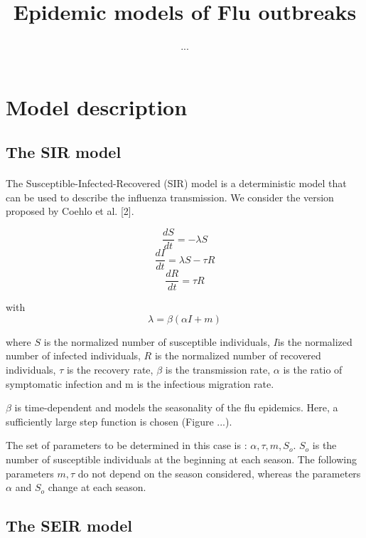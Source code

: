 \documentclass[11pt, a4paper]{article}
\author{...}
\title{Epidemic models of Flu outbreaks}
\begin{document}
\maketitle

\section{Model description}
\subsection{The SIR model}
\paragraph{}
The Susceptible-Infected-Recovered (SIR) model is a deterministic model that can be used to describe the influenza transmission. We consider the version proposed by Coehlo et al. [2].

\begin{equation}
\frac{dS}{dt} = - \lambda S
\end{equation}
\begin{equation}
\frac{dI}{dt} = \lambda S - \tau R
\end{equation}
\begin{equation}
\frac{dR}{dt} = \tau R
\end{equation}

with \[ \lambda = \beta (\alpha I + m) \]

where $S$ is the normalized number of susceptible individuals, $I$is the normalized number of infected individuals, $R$ is the normalized number of recovered individuals, $\tau $ is the recovery rate, $\beta $ is the transmission rate, $\alpha$ is the ratio of symptomatic infection and m is the infectious migration rate.

$\beta$ is time-dependent and models the seasonality of the flu epidemics. Here, a sufficiently large step function is chosen (Figure ...).


The set of parameters to be determined in this case is : $ { \alpha, \tau, m, S_o}$. $S_o$ is the number of susceptible individuals at the beginning at each season. The following parameters $m, \tau$ do not depend on the season considered, whereas the parameters $\alpha$ and $S_o$ change at each season.

\subsection{The SEIR model}
\end{document}
